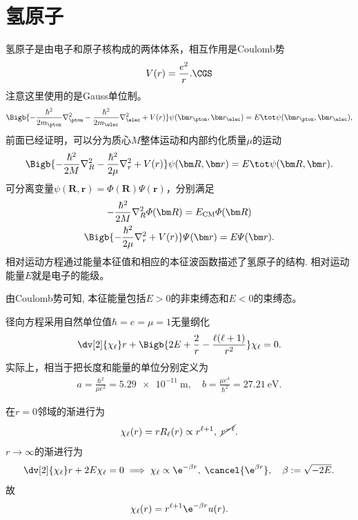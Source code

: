 \section{氢原子}
氢原子是由电子和原子核构成的两体体系，相互作用是Coulomb势 %
\[
	V(r)=\frac{e^2}r.\CGS
\]
注意这里使用的是Gauss单位制。
\[
	\Bigb{-\frac{\hbar^2}{2m_\pton}\nabla_\pton^2-\frac{\hbar^2}{2m_\elec}\nabla_\elec^2+V(r)}\psi(\bm r_\pton,\bm r_\elec)=E\tot\psi(\bm r_\pton,\bm r_\elec),
\]
前面已经证明，可以分为质心$M$整体运动和内部约化质量$\mu$的运动
\[
	\Bigb{-\frac{\hbar^2}{2M}\nabla_R^2-\frac{\hbar^2}{2\mu}\nabla_r^2+V(r)}\psi(\bm R,\bm r)=E\tot\psi(\bm R,\bm r).
\]
可分离变量$\psi(\bm R,\bm r)=\varPhi(\bm R)\varPsi(\bm r)$，分别满足
\begin{gather*}
	-\frac{\hbar^2}{2M}\nabla_R^2\varPhi(\bm R)=E_\mathrm{CM}\varPhi(\bm R)\\
	\Bigb{-\frac{\hbar^2}{2\mu}\nabla_r^2+V(r)}\varPsi(\bm r)=E\varPsi(\bm r).
\end{gather*}
相对运动方程通过能量本征值和相应的本征波函数描述了氢原子的结构. 相对运动能量$E$就是电子的能级。

由Coulomb势可知, 本征能量包括$E>0$的非束缚态和$E<0$的束缚态。

径向方程采用自然单位值$\hbar=e=\mu=1$无量纲化
\[
	\dv[2]{\chi_\ell}r+\Bigb{2E+\frac2r-\frac{\ell(\ell+1)}{r^2}}\chi_\ell=0.
\]
实际上，相当于把长度和能量的单位分别定义为
\begin{align}
	a=\frac{\hbar^2}{\mu e^2}=\SI{5.29e-11}\m,\quad b=\frac{\mu e^4}{\hbar^2}=\SI{27.21}\eV.
\end{align}

在$r=0$邻域的渐进行为
\[
	\chi_\ell(r)=rR_\ell(r)\propto r^{\ell+1},\;\cancel{r^{-\ell}}.
\]
$r\to\infty$的渐进行为
\[
	\dv[2]{\chi_\ell}r+2E\chi_\ell=0\implies\chi_\ell\propto\e^{-\beta r},\;\cancel{\e^{\beta r}},\quad \beta:=\sqrt{-2E}.
\]
故
\[
	\chi_\ell(r)=r^{\ell+1}\e^{-\beta r}u(r).
\]

